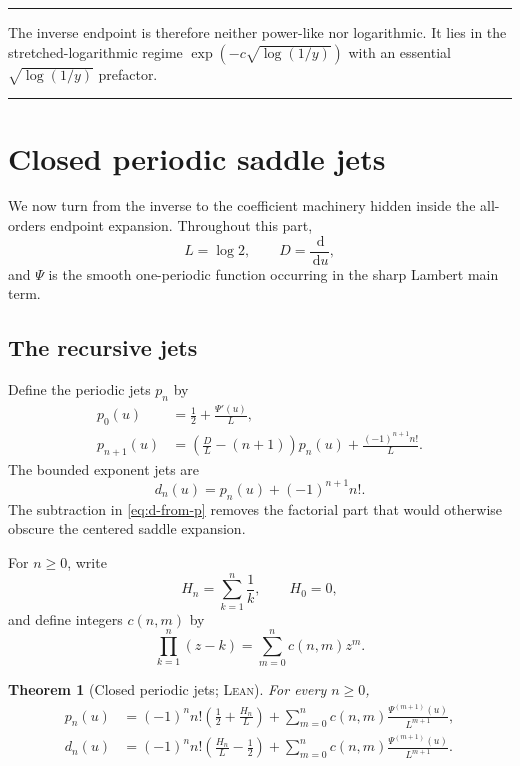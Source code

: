 \documentclass[11pt,oneside]{article}
\newtheorem{theorem}{Theorem}[section]
\theoremstyle{definition}
\theoremstyle{remark}
\newcommand{\dd}{\,\mathrm d}
\newenvironment{boxedremark}{%
  \par\smallskip\noindent\begin{center}\begin{minipage}{0.94\textwidth}%
  \color{black}\hrule\vspace{0.6em}\small
}{%
  \vspace{0.6em}\hrule\end{minipage}\end{center}\smallskip
}
\newcommand{\Formalized}{\textsc{Lean}}
\begin{document}
\begin{boxedremark}
The inverse endpoint is therefore neither power-like nor logarithmic.
It lies in the stretched-logarithmic regime
$\exp(-c\sqrt{\log(1/y)})$ with an essential
$\sqrt{\log(1/y)}$ prefactor.
\end{boxedremark}

\section{Closed periodic saddle jets}
\label{sec:closed-jets}

We now turn from the inverse to the coefficient machinery hidden inside
the all-orders endpoint expansion.  Throughout this part,
\[
 L=\log2,\qquad D=\frac{\dd}{\dd u},
\]
and $\Psi$ is the smooth one-periodic function occurring in the sharp
Lambert main term.

\subsection{The recursive jets}

Define the periodic jets $p_n$ by
\begin{align}
 p_0(u)&=\frac12+\frac{\Psi'(u)}L, \label{eq:p0}\\
 p_{n+1}(u)
 &=\left(\frac DL-(n+1)\right)p_n(u)
   +\frac{(-1)^{n+1}n!}{L}. \label{eq:p-recurrence}
\end{align}
The bounded exponent jets are
\begin{equation}
 d_n(u)=p_n(u)+(-1)^{n+1}n!. \label{eq:d-from-p}
\end{equation}
The subtraction in \eqref{eq:d-from-p} removes the factorial part that
would otherwise obscure the centered saddle expansion.

For $n\geq0$, write
\[
 H_n=\sum_{k=1}^n\frac1k,\qquad H_0=0,
\]
and define integers $c(n,m)$ by
\begin{equation}
 \prod_{k=1}^n(z-k)=\sum_{m=0}^n c(n,m)z^m.
 \label{eq:c-definition}
\end{equation}

\begin{theorem}[Closed periodic jets; \Formalized]
\label{thm:closed-jets}
For every $n\geq0$,
\begin{align}
 p_n(u)
 &=
 (-1)^n n!\left(\frac12+\frac{H_n}{L}\right)
 +\sum_{m=0}^n
   c(n,m)\frac{\Psi^{(m+1)}(u)}{L^{m+1}},
 \label{eq:p-closed}\\
 d_n(u)
 &=
 (-1)^n n!\left(\frac{H_n}{L}-\frac12\right)
 +\sum_{m=0}^n
   c(n,m)\frac{\Psi^{(m+1)}(u)}{L^{m+1}}.
 \label{eq:d-closed}
\end{align}
\end{theorem}
\end{document}
